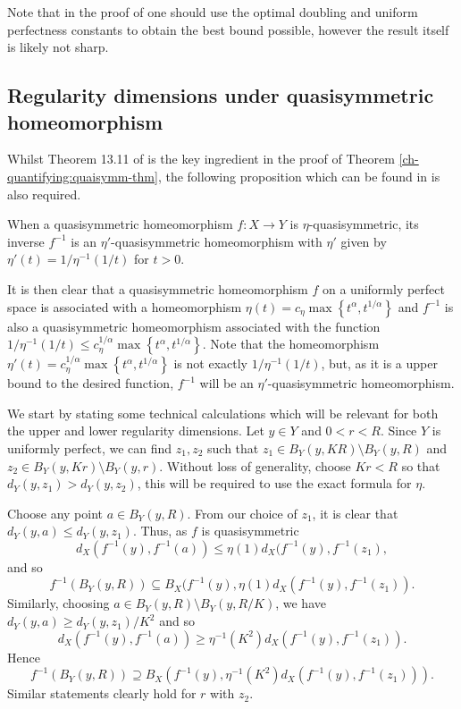 Note that in the proof of \cite{gromov} one should use the optimal doubling and uniform perfectness constants to obtain the best bound possible, however the result itself is likely not sharp.






\subsection{Regularity dimensions under quasisymmetric homeomorphism}\label{ch-quantifying:proof-quasi}


Whilst Theorem 13.11 of \cite{heinonen} is the key ingredient in the proof of Theorem \ref{ch-quantifying:quaisymm-thm}, the following proposition which can be found in \cite{heinonen} is also required.

\begin{proposition}
	When a quasisymmetric homeomorphism $f\colon X \rightarrow Y$ is $\eta$-quasisymmetric, its inverse $f^{-1}$ is an $\eta'$-quasisymmetric homeomorphism with $\eta'$ given by  $\eta'(t) = 1/\eta^{-1}(1/t)$ for $t>0$.
\end{proposition}

It is then clear that a quasisymmetric homeomorphism $f$ on a uniformly perfect space is associated with a homeomorphism $\eta(t) = c_\eta\max\left\{t^\alpha, t^{1/\alpha}\right\}$ and $f^{-1}$ is also a quasisymmetric homeomorphism associated with the function $1/\eta^{-1}(1/t) \le c_\eta^{1/\alpha} \max\left\{t^\alpha, t^{1/\alpha} \right\}$. Note that the homeomorphism $\eta'(t) = c_\eta^{1/\alpha} \max\left\{t^\alpha, t^{1/\alpha} \right\}$ is not exactly $1/\eta^{-1}(1/t)$, but, as it is a upper bound to the desired function, $f^{-1}$ will be an $\eta'$-quasisymmetric homeomorphism.



We start by stating some technical calculations which will be relevant for both the upper and lower regularity dimensions. Let $y\in Y$ and $0<r<R$. Since $Y$ is uniformly perfect, we can find $z_1,z_2$ such that $z_1\in B_Y(y,KR) \setminus B_Y(y,R)$ and $z_2 \in B_Y(y,Kr) \setminus B_Y(y,r)$. Without loss of generality, choose $ Kr < R $ so that $d_Y(y,z_1) > d_Y(y,z_2)$,  this will be required to use the exact formula for $\eta$.
	
	
Choose any point $a \in B_Y(y,R)$. From our choice of $z_1$, it is clear that $d_Y( y , a ) \le d_Y(y , z_1)$. Thus, as $f$ is quasisymmetric 
$$d_X( f^{-1}(y) , f^{-1}(a) ) \le \eta(1)  d_X(f^{-1}(y) , f^{-1}(z_1), $$
and so 
\[
f^{-1}(B_Y(y,R)) \subseteq B_X(f^{-1}(y),\eta(1)d_X(f^{-1}(y), f^{-1}(z_1)).
\]
Similarly, choosing $a \in B_Y(y,R) \setminus B_Y(y,R/K)$, we have $d_Y( y , a ) \ge d_Y( y , z_1 )/K^2$ and so $$d_X( f^{-1}(y) , f^{-1}(a) ) \ge \eta^{-1}(K^2) d_X( f^{-1}(y) , f^{-1}(z_1) ).$$
Hence 
\[
f^{-1}(B_Y(y,R)) \supseteq B_X(f^{-1}(y),\eta^{-1}(K^2)d_X(f^{-1}(y),f^{-1}(z_1))).
\]
Similar statements clearly hold for $r$ with $z_2$. 

